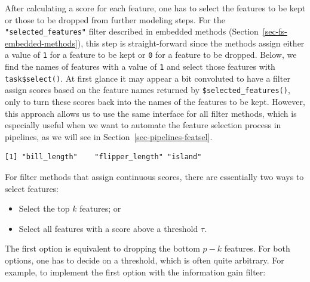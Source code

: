 After calculating a score for each feature, one has to select the
features to be kept or those to be dropped from further modeling steps.
For the \texttt{"selected\_features"} filter described in embedded
methods (Section~\ref{sec-fs-embedded-methods}), this step is
straight-forward since the methods assign either a value of \texttt{1}
for a feature to be kept or \texttt{0} for a feature to be dropped.
Below, we find the names of features with a value of \texttt{1} and
select those features with \texttt{task\$select()}. At first glance it
may appear a bit convoluted to have a filter assign scores based on the
feature names returned by \texttt{\$selected\_features()}, only to turn
these scores back into the names of the features to be kept. However,
this approach allows us to use the same interface for all filter
methods, which is especially useful when we want to automate the feature
selection process in pipelines, as we will see in
Section~\ref{sec-pipelines-featsel}.

\begin{Shaded}
\begin{Highlighting}[]
\SpecialCharTok{$}

\OtherTok{=} \NormalTok{(}\SpecialCharTok{$}\SpecialCharTok{==} \NormalTok{))}
\SpecialCharTok{$}
\SpecialCharTok{$}
\end{Highlighting}
\end{Shaded}

\begin{verbatim}
[1] "bill_length"    "flipper_length" "island"        
\end{verbatim}

For filter methods that assign continuous scores, there are essentially
two ways to select features:

\begin{itemize}
\tightlist
\item
  Select the top \(k\) features; or
\item
  Select all features with a score above a threshold \(\tau\).
\end{itemize}

The first option is equivalent to dropping the bottom \(p-k\) features.
For both options, one has to decide on a threshold, which is often quite
arbitrary. For example, to implement the first option with the
information gain filter:

